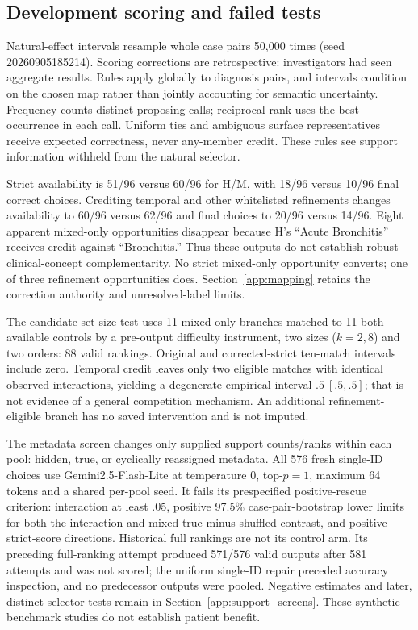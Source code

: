 \subsection{Development scoring and failed tests}\label{app:statistics}\label{app:results}\label{app:interface}
Natural-effect intervals resample whole case pairs 50,000 times (seed 20260905185214). Scoring corrections are retrospective: investigators had seen aggregate results. Rules apply globally to diagnosis pairs, and intervals condition on the chosen map rather than jointly accounting for semantic uncertainty. Frequency counts distinct proposing calls; reciprocal rank uses the best occurrence in each call. Uniform ties and ambiguous surface representatives receive expected correctness, never any-member credit. These rules see support information withheld from the natural selector.

Strict availability is 51/96 versus 60/96 for H/M, with 18/96 versus 10/96 final correct choices. Crediting temporal and other whitelisted refinements changes availability to 60/96 versus 62/96 and final choices to 20/96 versus 14/96. Eight apparent mixed-only opportunities disappear because H's ``Acute Bronchitis'' receives credit against ``Bronchitis.'' Thus these outputs do not establish robust clinical-concept complementarity. No strict mixed-only opportunity converts; one of three refinement opportunities does. Section~\ref{app:mapping} retains the correction authority and unresolved-label limits.

The candidate-set-size test uses 11 mixed-only branches matched to 11 both-available controls by a pre-output difficulty instrument, two sizes ($k=2,8$) and two orders: 88 valid rankings. Original and corrected-strict ten-match intervals include zero. Temporal credit leaves only two eligible matches with identical observed interactions, yielding a degenerate empirical interval $.5\ [.5,.5]$; that is not evidence of a general competition mechanism. An additional refinement-eligible branch has no saved intervention and is not imputed.

The metadata screen changes only supplied support counts/ranks within each pool: hidden, true, or cyclically reassigned metadata. All 576 fresh single-ID choices use Gemini2.5-Flash-Lite at temperature 0, top-$p=1$, maximum 64 tokens and a shared per-pool seed. It fails its prespecified positive-rescue criterion: interaction at least .05, positive 97.5\% case-pair-bootstrap lower limits for both the interaction and mixed true-minus-shuffled contrast, and positive strict-score directions. Historical full rankings are not its control arm. Its preceding full-ranking attempt produced 571/576 valid outputs after 581 attempts and was not scored; the uniform single-ID repair preceded accuracy inspection, and no predecessor outputs were pooled. Negative estimates and later, distinct selector tests remain in Section~\ref{app:support_screens}. These synthetic benchmark studies do not establish patient benefit.


